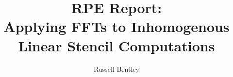 \documentclass[10pt]{article}
\title{RPE Report: \\ Applying FFTs to Inhomogenous Linear Stencil Computations}
\author{Russell Bentley}
\begin{document}
\maketitle

\tableofcontents

\twocolumn

%





%

\printbibliography
\end{document}
